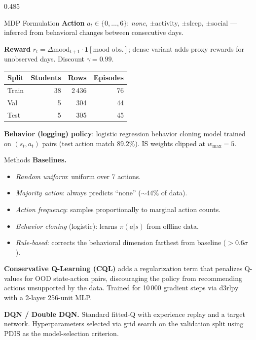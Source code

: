 \documentclass[final]{beamer}
\begin{document}
\begin{frame}[t]{}
\begin{columns}[T]
\begin{column}{0.485\linewidth}
\begin{block}{MDP Formulation}
\textbf{Action} $a_t \in \{0,\ldots,6\}$: \textit{none}, $\pm$activity,
$\pm$sleep, $\pm$social — inferred from behavioral changes between consecutive days.

\textbf{Reward} $r_t = \Delta\text{mood}_{t+1} \cdot \mathbf{1}[\text{mood obs.}]$;
dense variant adds proxy rewards for unobserved days.
Discount $\gamma = 0.99$.

\medskip
\begin{center}
\begin{tabular}{lrrr}
\toprule
Split & Students & Rows & Episodes \\
\midrule
Train  & 38 & 2\,436 & 76 \\
Val    & 5  &   304  & 44 \\
Test   & 5  &   305  & 45 \\
\bottomrule
\end{tabular}
\end{center}

\textbf{Behavior (logging) policy}: logistic regression behavior cloning
model trained on $(s_t, a_t)$ pairs (test action match $89.2\%$).
IS weights clipped at $w_{\max}{=}5$.
\end{block}

\begin{block}{Methods}
\justifying
\textbf{Baselines.}
\begin{itemize}
  \item \textit{Random uniform}: uniform over 7 actions.
  \item \textit{Majority action}: always predicts ``none'' (${\sim}44\%$ of data).
  \item \textit{Action frequency}: samples proportionally to marginal action counts.
  \item \textit{Behavior cloning} (logistic): learns $\pi(a|s)$ from offline data.
  \item \textit{Rule-based}: corrects the behavioral dimension farthest from
        baseline ($>0.6\sigma$).
\end{itemize}

\medskip
\textbf{Conservative Q-Learning (CQL)} \citep{kumar2020cql}
adds a regularization term that penalizes Q-values for OOD state-action
pairs, discouraging the policy from recommending actions unsupported by the
data.  Trained for 10\,000 gradient steps via d3rlpy with a 2-layer
256-unit MLP.

\medskip
\textbf{DQN / Double DQN.}
Standard fitted-Q with experience replay and a target network.
Hyperparameters selected via grid search on the validation split using
PDIS as the model-selection criterion.


\end{block}
\end{column}
\end{columns}
\end{frame}
\end{document}
